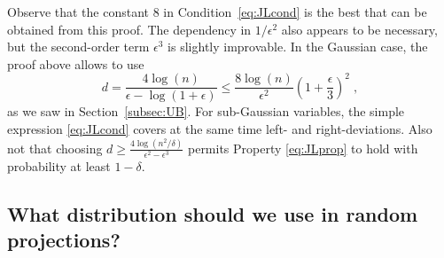 \documentclass{ps}
\newcommand{\1}{\mathbbm{1}}
\theoremstyle{plain}
\begin{document}
Observe that the constant $8$ in Condition~\eqref{eq:JLcond} is the best that can be obtained from this proof. The dependency in $1/\epsilon^2$ also appears to be necessary, but the second-order term $\epsilon^3$ is slightly improvable. In the Gaussian case, the proof above allows to use 
\[d=\frac{4\log(n)}{\epsilon-\log(1+\epsilon)} \leq \frac{8\log(n)}{\epsilon^2} \left(1+\frac{\epsilon}{3}\right)^2\;,\]
as we saw in Section~\ref{subsec:UB}. For sub-Gaussian variables, the simple expression \eqref{eq:JLcond} covers at the same time left- and right-deviations. 
Also not that choosing $d\geq \frac{4\log(n^2/\delta)}{\epsilon^2-\epsilon^3}$
permits Property \eqref{eq:JLprop} to hold with probability at least $1-\delta$.


\subsection{What distribution should we use in random projections?}\label{sec:RP}
\end{document}
